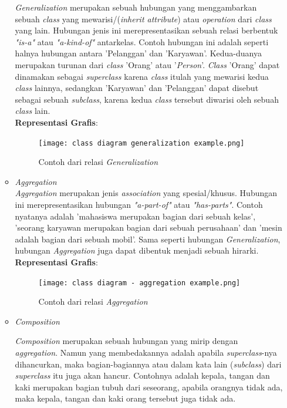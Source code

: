 \documentclass[a4paper]{article}
\begin{document}
\begin{enumerate}
\begin{itemize}
        \textit{Generalization} merupakan sebuah hubungan yang menggambarkan sebuah \textit{class} yang mewarisi/(\textit{inherit attribute}) atau \textit{operation} dari \textit{class} yang lain\autocite{what-is-class-diagram}. Hubungan jenis ini merepresentasikan sebuah relasi berbentuk \textit{"is-a"} atau \textit{"a-kind-of"} antarkelas. Contoh hubungan ini adalah seperti halnya hubungan antara 'Pelanggan' dan 'Karyawan'. Kedua-duanya merupakan turunan dari \textit{class} 'Orang' atau '\textit{Person}'. \textit{Class} 'Orang' dapat dinamakan sebagai \textit{superclass} karena \textit{class} itulah yang mewarisi kedua \textit{class} lainnya, sedangkan 'Karyawan' dan 'Pelanggan' dapat disebut sebagai sebuah \textit{subclass}, karena kedua \textit{class} tersebut diwarisi oleh sebuah \textit{class} lain\autocite{systemanalysisdesign-class-diagram-relations}.\\
        \textbf{Representasi Grafis}:\\
        \begin{figure}[h]
            \centering
            \texttt{[image: class diagram generalization example.png]}
            \caption{Contoh dari relasi \textit{Generalization}}
        \end{figure}
        \item \textit{Aggregation}\\
        \textit{Aggregation} merupakan jenis \textit{association} yang spesial/khusus. Hubungan ini merepresentasikan hubungan \textit{"a-part-of"} atau \textit{"has-parts"}. Contoh nyatanya adalah 'mahasiswa merupakan bagian dari sebuah kelas', 'seorang karyawan merupakan bagian dari sebuah perusahaan' dan 'mesin adalah bagian dari sebuah mobil'. Sama seperti hubungan \textit{Generalization}, hubungan \textit{Aggregation} juga dapat dibentuk menjadi sebuah hirarki\autocite{systemanalysisdesign-class-diagram-relations}.\\
        \textbf{Representasi Grafis}:\\
        \begin{figure}[h]
            \centering
            \texttt{[image: class diagram - aggregation example.png]}
            \caption{Contoh dari relasi \textit{Aggregation}}
        \end{figure}

        \item \textit{Composition}

        \textit{Composition} merupakan sebuah hubungan yang mirip dengan \textit{aggregation}. Namun yang membedakannya adalah apabila \textit{superclass}-nya dihancurkan, maka bagian-bagiannya atau dalam kata lain (\textit{subclass}) dari \textit{superclass} itu juga akan hancur. Contohnya adalah kepala, tangan dan kaki merupakan bagian tubuh dari seseorang, apabila orangnya tidak ada, maka kepala, tangan dan kaki orang tersebut juga tidak ada\autocite{what-is-class-diagram}.


\end{itemize}
\end{enumerate}
\end{document}
